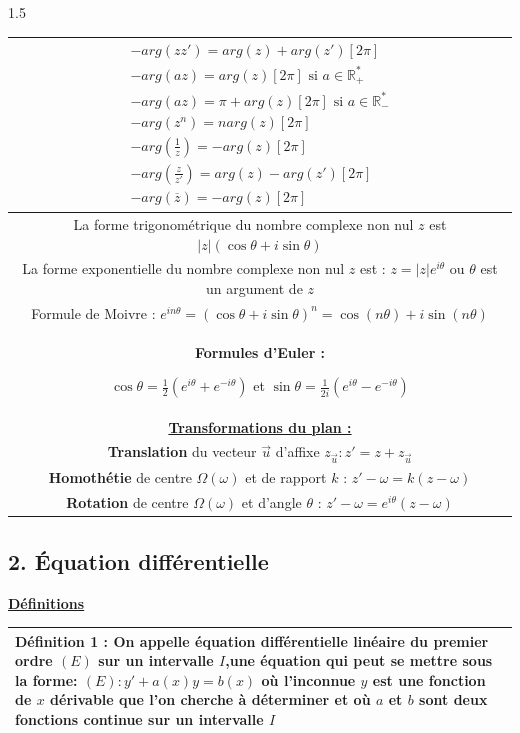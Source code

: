 \documentclass[12pt]{article}
\begin{document}
\begin{spacing}{1.5}
\begin{table}[h!]
{\begin{tabular}{|c|}
 
 $\begin{array}{c}
 -arg(zz')=arg(z)+arg(z')[2\pi]\\
 -arg(az)=arg(z)[2\pi] \text{ si } a \in \mathbb{R}_{+}^{*}\\
 -arg( az)=\pi+arg(z)[2\pi] \text{ si } a\in \mathbb{R}_{-}^{*}\\
 -arg(z^n)=n arg(z) [2\pi]\\
 -arg(\frac{	1}{z})=-arg(z)[2\pi]\\
 -arg(\frac{z}{z'})=arg(z)-arg(z')[2\pi]\\
 -arg(\overline{z})=-arg(z)[2\pi]
 \end{array}$\\
 \hline
 La forme trigonométrique du nombre complexe non nul $z$ est $\vert z\vert(\cos\theta+i\sin\theta)$\\
 \hline
 La forme exponentielle du nombre complexe non nul $z$ est : $z=\vert z\vert e^{i\theta}$ ou $\theta$ est un argument de $z$\\
 \hline
 Formule de Moivre : $e^{in\theta}=(\cos\theta+i\sin\theta)^n=\cos(n\theta)+i\sin(n\theta)$\\
 \hline
\textbf{ Formules d'Euler :}

 $\cos\theta=\frac{1}{2}(e^{i\theta}+e^{-i\theta})$ et $\sin\theta=\frac{1}{2i}(e^{i\theta}-e^{-i\theta})$ \\
 \hline
 \textbf{\underline{Transformations du plan :}}\\
\textbf{ Translation} du vecteur $\overrightarrow{u}$ d'affixe $z_{\overrightarrow{u}} : z'=z+z_{\overrightarrow{u}}$\\
\textbf{ Homothétie} de centre $\Omega(\omega)$ et de rapport $k$ : $z'-\omega=k(z-\omega)$\\
 \textbf{Rotation} de centre $\Omega(\omega)$ et d'angle $\theta$ : $z'-\omega=e^{i\theta}(z-\omega)$\\
 \hline
 \end{tabular}
 }
 \end{table}






\subsection*{2. Équation différentielle}

\quad


\checkmark \quad \textbf{\underline{Définitions}}

\quad  \begin{tabular}{|p{15cm}|}
\hline 
 \textbf{ Définition 1 :} On appelle équation différentielle linéaire du premier ordre $(E)$ sur un intervalle $I$,une 
équation qui peut se mettre sous la forme:
 $(E) : y'+a(x)y=b(x)$ où l'inconnue $y$ est une 
 fonction de $x$ dérivable que l'on cherche à déterminer et où $a$ et $b$ sont deux fonctions continue sur un intervalle $I$\\ 
\hline 
\end{tabular}


\end{spacing}
\end{document}
